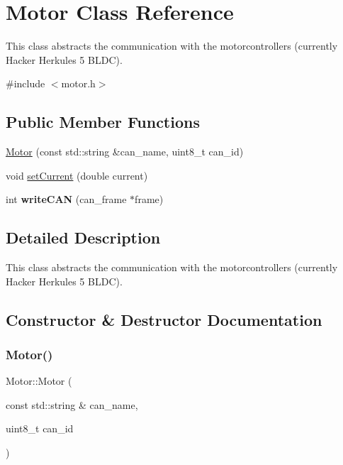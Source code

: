 \hypertarget{classMotor}{}\section{Motor Class Reference}
\label{classMotor}


This class abstracts the communication with the motorcontrollers (currently Hacker Herkules 5 B\+L\+DC).  




{\ttfamily \#include $<$motor.\+h$>$}

\subsection*{Public Member Functions}
\begin{DoxyCompactItemize}
\item 
\hyperlink{classMotor_a00bdaca43863fd9de6b48f5cf53bbfc3}{Motor} (const std\+::string \&can\+\_\+name, uint8\+\_\+t can\+\_\+id)
\item 
void \hyperlink{classMotor_ac33c3799c5e7779de654a881d590986d}{set\+Current} (double current)
\item 
\mbox{\label{classMotor_a77185f4c17591bed876cbb3e5d8735f1}} 
int {\bfseries write\+C\+AN} (can\+\_\+frame $\ast$frame)
\end{DoxyCompactItemize}


\subsection{Detailed Description}
This class abstracts the communication with the motorcontrollers (currently Hacker Herkules 5 B\+L\+DC). 

\subsection{Constructor \& Destructor Documentation}
\mbox{\label{classMotor_a00bdaca43863fd9de6b48f5cf53bbfc3}} 
\subsubsection{\texorpdfstring{Motor()}{Motor()}}
{\footnotesize\ttfamily Motor\+::\+Motor (\begin{DoxyParamCaption}\item[{const std\+::string \&}]{can\+\_\+name,  }\item[{uint8\+\_\+t}]{can\+\_\+id }\end{DoxyParamCaption})}

